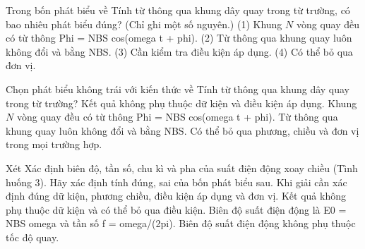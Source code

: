 \begin{ex}
Trong bốn phát biểu về Tính từ thông qua khung dây quay trong từ trường, có bao nhiêu phát biểu đúng? (Chỉ ghi một số nguyên.) (1) Khung $N$ vòng quay đều có từ thông Phi = NBS cos(omega t + phi). (2) Từ thông qua khung quay luôn không đổi và bằng NBS. (3) Cần kiểm tra điều kiện áp dụng. (4) Có thể bỏ qua đơn vị.
\end{ex}

\begin{ex}
Chọn phát biểu không trái với kiến thức về Tính từ thông qua khung dây quay trong từ trường?
\choice
{Kết quả không phụ thuộc dữ kiện và điều kiện áp dụng.}
{\True Khung $N$ vòng quay đều có từ thông Phi = NBS cos(omega t + phi).}
{Từ thông qua khung quay luôn không đổi và bằng NBS.}
{Có thể bỏ qua phương, chiều và đơn vị trong mọi trường hợp.}
\end{ex}

\begin{ex}
Xét Xác định biên độ, tần số, chu kì và pha của suất điện động xoay chiều (Tình huống 3). Hãy xác định tính đúng, sai của bốn phát biểu sau.
\choiceTF
{\True Khi giải cần xác định đúng dữ kiện, phương chiều, điều kiện áp dụng và đơn vị.}
{Kết quả không phụ thuộc dữ kiện và có thể bỏ qua điều kiện.}
{\True Biên độ suất điện động là E0 = NBS omega và tần số f = omega/(2pi).}
{Biên độ suất điện động không phụ thuộc tốc độ quay.}
\end{ex}

